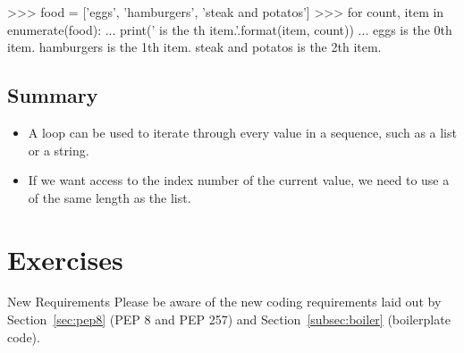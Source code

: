 \documentclass[11pt]{cselabheader}
\begin{document}
\begin{pyconcode}
>>> food = ['eggs', 'hamburgers', 'steak and potatos']
>>> for count, item in enumerate(food):
...     print('{} is the {}th item.'.format(item, count))
...
eggs is the 0th item.
hamburgers is the 1th item.
steak and potatos is the 2th item.
\end{pyconcode}

\subsection{Summary}
\begin{itemize}
  \item A  loop can be used to iterate through every value in a
    sequence, such as a list or a string.
  \item If we want access to the index number of the current value, we need to
    use a  of the same length as the list.
\end{itemize}

\pagebreak
\section{Exercises}
\label{sec:ex}


\begin{warningbox}{New Requirements}
  Please be aware of the new coding requirements laid out by
  Section~\ref{sec:pep8} (PEP 8 and PEP 257) and Section~\ref{subsec:boiler}
  (boilerplate code).
\end{warningbox}
\end{document}
